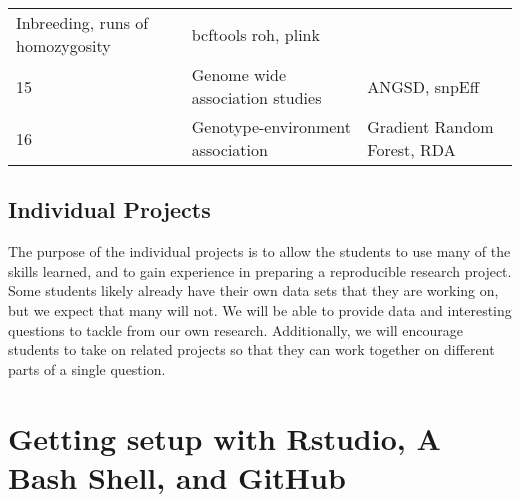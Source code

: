 \documentclass[]{book}
\begin{document}
\begin{longtable}[]{@{}lll@{}}
\begin{minipage}[t]{0.46\columnwidth}
Inbreeding, runs of homozygosity\strut
\end{minipage} & \begin{minipage}[t]{0.33\columnwidth}\raggedright
bcftools roh, plink\strut
\end{minipage}\tabularnewline
\begin{minipage}[t]{0.13\columnwidth}\raggedright
15\strut
\end{minipage} & \begin{minipage}[t]{0.46\columnwidth}\raggedright
Genome wide association studies\strut
\end{minipage} & \begin{minipage}[t]{0.33\columnwidth}\raggedright
ANGSD, snpEff\strut
\end{minipage}\tabularnewline
\begin{minipage}[t]{0.13\columnwidth}\raggedright
16\strut
\end{minipage} & \begin{minipage}[t]{0.46\columnwidth}\raggedright
Genotype-environment association\strut
\end{minipage} & \begin{minipage}[t]{0.33\columnwidth}\raggedright
Gradient Random Forest, RDA\strut
\end{minipage}\tabularnewline
\bottomrule
\end{longtable}

\hypertarget{indproj}{%
\section*{Individual Projects}\label{indproj}}

The purpose of the individual projects is to allow the students to use
many of the skills learned, and to gain experience in preparing a reproducible
research project. Some students likely already have their own data sets
that they are working on, but we expect that many will not. We will be
able to provide data and interesting questions to tackle from our own research.
Additionally, we will encourage students to take on related projects so that
they can work together on different parts of a single question.

\hypertarget{getting-setup-with-rstudio-a-bash-shell-and-github}{%
\chapter{Getting setup with Rstudio, A Bash Shell, and GitHub}\label{getting-setup-with-rstudio-a-bash-shell-and-github}}
\end{document}
